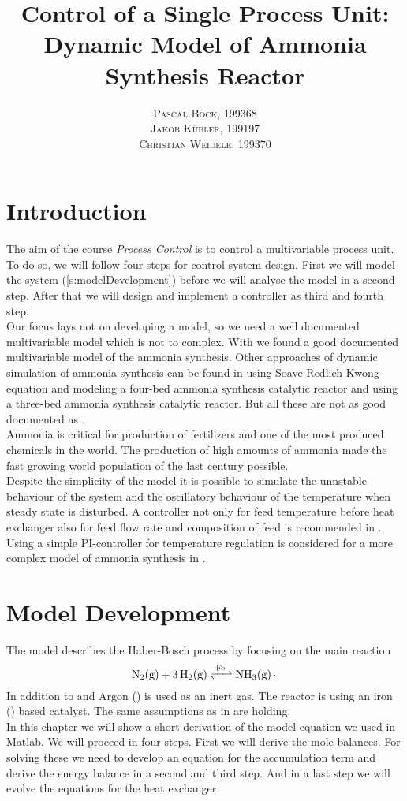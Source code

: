 \documentclass[paper=letter, fontsize=12pt]{article}
\title{\vspace{-15mm}\fontsize{24pt}{10pt}\selectfont\textbf{Control of a Single Process Unit: Dynamic Model of Ammonia Synthesis Reactor}} %
\author{
\large
{\textsc{Pascal Bock, 199368 }}\\[2mm]
{\textsc{Jakob Kübler, 199197 }}\\[2mm]
{\textsc{Christian Weidele, 199370 }}\\[2mm]
}
\date{}
\newcommand\reaction[1]{\begin{equation}\ce{#1}\end{equation}}
\begin{document}
\maketitle %
\thispagestyle{fancy} %


\section{Introduction}
The aim of the course \emph{Process Control} is to control a multivariable process unit. To do so, we will follow four steps for control system design. First we will model the system (\autoref{s:modelDevelopment}) before we will analyse the model in a second step. After that we will design and implement a controller as third and fourth step. \\
Our focus lays not on developing a model, so we need a well documented multivariable model which is not to complex. With \cite{Jinasena2016} we found a good documented multivariable model of the ammonia synthesis. Other approaches of dynamic simulation of ammonia synthesis can be found in \cite{Kasiri2003} using Soave-Redlich-Kwong equation and modeling a four-bed ammonia synthesis catalytic reactor and \cite{Mancusi2009} using a three-bed ammonia synthesis catalytic reactor. But all these are not as good documented as \cite{Jinasena2016}.\\
Ammonia is critical for production of fertilizers and one of the most produced chemicals in the world. The production of high amounts of ammonia made the fast growing world population of the last century possible. \cite{Pattabathula2016} \\
Despite the simplicity of the model it is possible to simulate the unnstable behaviour of the system and the oscillatory behaviour of the temperature when steady state is disturbed. A controller not only for feed temperature before heat exchanger also for feed flow rate and composition of feed is recommended in \cite{Jinasena2016}. Using a simple PI-controller for temperature regulation is considered for a more complex model of ammonia synthesis in \cite{Morud1998}.


\section{Model Development} \label{s:modelDevelopment}

The model describes the Haber-Bosch process by focusing on the main reaction
\reaction{N2(g) + 3H2(g) <=>[Fe] NH3(g).} \label{f:reaction}
In addition to  and  Argon () is used as an inert gas. The reactor is using an iron () based catalyst. The same assumptions as in \cite{Jinasena2016} are holding.\\
In this chapter we will show a short derivation of the model equation we used in Matlab. We will proceed in four steps. First we will derive the mole balances. For solving these we need to develop an equation for the accumulation term and derive the energy balance in a second and third step. And in a last step we will evolve the equations for the heat exchanger.
\end{document}
